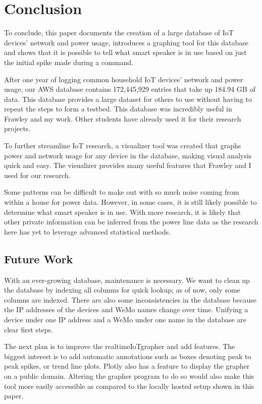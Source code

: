 \chapter{Conclusion}
\label{Conclusion}
To conclude, this paper documents the creation of a large database of IoT devices' network and power usage, introduces a graphing tool for this database and shows that it is possible to tell what smart speaker is in use based on just the initial spike made during a command.

After one year of logging common household IoT devices' network and power usage, our AWS database contains 172,445,929 entries that take up 184.94 GB of data. This database provides a large dataset for others to use without having to repeat the steps to form a testbed. This database was incredibly useful in Frawley and my work. Other students have already used it for their research projects.

To further streamline IoT research, a visualizer tool was created that graphs power and network usage for any device in the database, making visual analysis quick and easy. The visualizer provides many useful features that Frawley and I used for our research.

Some patterns can be difficult to make out with so much noise coming from within a house for power data. However, in some cases, it is still likely possible to determine what smart speaker is in use. With more research, it is likely that other private information can be inferred from the power line data as the research here has yet to leverage advanced statistical methods.

\section{Future Work}
With an ever-growing database, maintenance is necessary. We want to clean up the database by indexing all columns for quick lookup; as of now, only some columns are indexed. There are also some inconsistencies in the database because the IP addresses of the devices and WeMo names change over time. Unifying a device under one IP address and a WeMo under one name in the database are clear first steps.

The next plan is to improve the realtimeIoTgrapher and add features. The biggest interest is to add automatic annotations such as boxes denoting peak to peak spikes, or trend line plots. Plotly also has a feature to display the grapher on a public domain. Altering the grapher program to do so would also make this tool more easily accessible as compared to the locally hosted setup shown in this paper.

